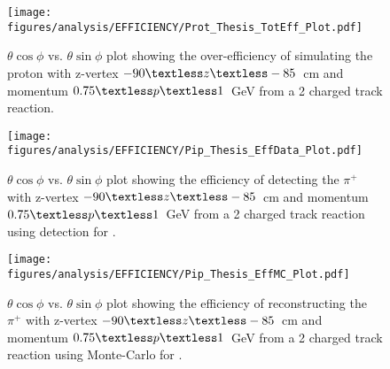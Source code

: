 %
\begin{figure}[h!]\begin{center}
\texttt{[image: \\figures/analysis/EFFICIENCY/Prot\_Thesis\_TotEff\_Plot.pdf]}
\caption[$\theta \cos\phi$ vs. $\theta \sin\phi$ plot showing the over-efficiency of simulating the proton with z-vertex $-90\textless z\textless-85$~cm and momentum $0.75\textless p \textless 1$~GeV from a 2 charged track reaction]{\label{fig:toteff_prot} $\theta \cos\phi$ vs. $\theta \sin\phi$ plot showing the over-efficiency of simulating the proton with z-vertex $-90\textless z\textless-85$~cm and momentum $0.75\textless p \textless 1$~GeV from a 2 charged track reaction.}
\end{center}\end{figure}
\begin{figure}[h!]\begin{center}
\texttt{[image: \\figures/analysis/EFFICIENCY/Pip\_Thesis\_EffData\_Plot.pdf]}
\caption[$\theta \cos\phi$ vs. $\theta \sin\phi$ plot showing the efficiency of detecting the $\pi^+$ with z-vertex $-90\textless z\textless-85$~cm and momentum $0.75\textless p \textless 1$~GeV from a 2 charged track reaction using  detection for ]{\label{fig:eff_pip_data} $\theta \cos\phi$ vs. $\theta \sin\phi$ plot showing the efficiency of detecting the $\pi^+$ with z-vertex $-90\textless z\textless-85$~cm and momentum $0.75\textless p \textless 1$~GeV from a 2 charged track reaction using  detection for .}
\end{center}\end{figure}
%
\begin{figure}[h!]\begin{center}
\texttt{[image: \\figures/analysis/EFFICIENCY/Pip\_Thesis\_EffMC\_Plot.pdf]}
\caption[$\theta \cos\phi$ vs. $\theta \sin\phi$ plot showing the efficiency of reconstructing the $\pi^+$ with z-vertex $-90\textless z\textless-85$~cm and momentum $0.75\textless p \textless 1$~GeV from a 2 charged track reaction using  Monte-Carlo for ]{\label{fig:eff_pip_MC} $\theta \cos\phi$ vs. $\theta \sin\phi$ plot showing the efficiency of reconstructing the $\pi^+$ with z-vertex $-90\textless z\textless-85$~cm and momentum $0.75\textless p \textless 1$~GeV from a 2 charged track reaction using  Monte-Carlo for .}
\end{center}\end{figure}
%
